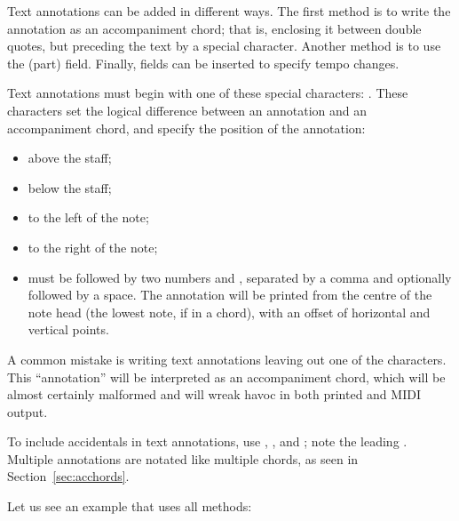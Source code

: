 \documentclass[a4paper,fullpage,12pt]{book}
\begin{document}
Text annotations can be added in different ways. The first method is
to write the annotation as an accompaniment chord; that is, enclosing
it between double quotes, but preceding the text by a special
character. Another method is to use the  (part) field.
Finally,  fields can be inserted to specify tempo changes.

Text annotations must begin with one of these special characters:
. These characters set the logical
difference between an annotation and an accompaniment chord, and
specify the position of the annotation:

\begin{itemize}

  \item \car{\textasciicircum} above the staff;
  
  \item \car{\_} below the staff;
  
  \item \car{\textless} to the left of the note;
  
  \item \car{\textgreater} to the right of the note;
  
  \item {} must be followed by two numbers  and ,
  separated by a comma and optionally followed by a space. The
  annotation will be printed from the centre of the note head (the
  lowest note, if in a chord), with an offset of  horizontal
  and  vertical points.
  
\end{itemize}

\begin{vimp}

  A common mistake is writing text annotations leaving out one of the 
   characters. This ``annotation''
  will be interpreted as an accompaniment chord, which will be almost
  certainly malformed and will wreak havoc in both printed and MIDI
  output.

\end{vimp}

To include accidentals in text annotations, use \car{\bl{}\#},
, and \car{\bl{}=}; note the leading \car{\bl{}}. Multiple
annotations are notated like multiple chords, as seen in
Section~\ref{sec:acchords}.

Let us see an example that uses all methods:
\end{document}
